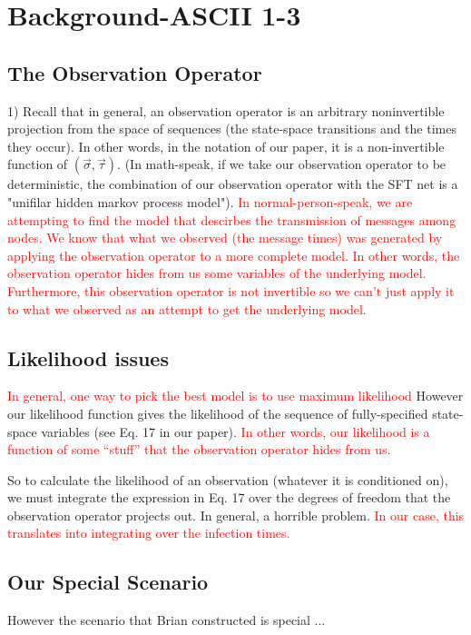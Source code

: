 \documentclass{article}
\begin{document}
\section{Background-ASCII 1-3}

\subsection{The Observation Operator}

	1) Recall that in general, an observation operator is an arbitrary
	noninvertible projection from the space of sequences (the state-space
	transitions and the times they occur). In other words, in the notation
	of our paper, it is a non-invertible function of $(\vec{\sigma},
	\vec{\tau})$. (In math-speak, if we take our observation operator to be
	deterministic, the combination of our observation operator with the
	SFT net is a "unifilar hidden markov process model").  \textcolor{red}{In
	normal-person-speak, we are attempting to find the model that descirbes
	the transmission of messages among nodes.  We know that what we
	observed (the message times) was generated  by applying the observation
	operator to a more complete model.  In other words, the observation 
        operator hides from us some variables of the underlying model.  
        Furthermore, this observation operator is not invertible so we can't 
        just apply it to what we observed as an attempt to get the underlying 
        model.}

\subsection{Likelihood issues}
	\textcolor{red}{In general, one way to pick the best model is to use 
          maximum likelihood} However our likelihood function gives the 
        likelihood of the sequence of fully-specified state-space variables 
        (see Eq. 17 in our paper). \textcolor{red}{In other words, our likelihood
        is a function of some ``stuff'' that the observation operator hides from 
        us.}

	So to calculate the likelihood of an observation (whatever it is
	conditioned on), we must integrate the expression in Eq. 17 over the
	degrees of freedom that the observation operator projects out. In
	general, a horrible problem.  \textcolor{red}{In our case, this translates
	into integrating over the infection times.} 

\subsection{Our Special Scenario}	
        However the scenario that Brian constructed is special ...
\end{document}
